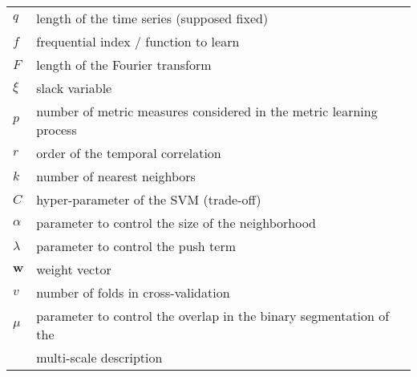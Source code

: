 \begin{tabular}{ll}
	$q$			& length of the time series (supposed fixed) \\
	$f$			& frequential index / function to learn \\	
	$F$			& length of the Fourier transform \\
	$\xi$		& slack variable \\
	$p$			& number of metric measures considered in the metric learning 	process \\
	$r$			& order of the temporal correlation \\
	$k$			& number of nearest neighbors \\
	$C$ 		& hyper-parameter of the SVM (trade-off)\\ 
	$\alpha$	& parameter to control the size of the neighborhood\\
	$\lambda$	& parameter to control the push term\\
	$\textbf{w}$ & weight vector \\
	$v$			& number of folds in cross-validation \\
	$\mu$		& parameter to control the overlap in the binary segmentation of the \\ & multi-scale description

\end{tabular} 




